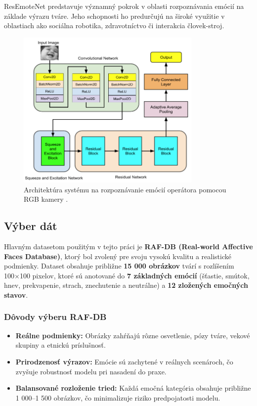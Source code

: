 ResEmoteNet predstavuje významný pokrok v oblasti rozpoznávania emócií na základe výrazu tváre. Jeho schopnosti ho predurčujú na široké využitie v oblastiach ako sociálna robotika, zdravotníctvo či interakcia človek-stroj.

\begin{figure}[!htpb]
    \centering
    \includegraphics[width=0.8\textwidth]{img/architecture.png}
    \caption{Architektúra systému na rozpoznávanie emócií operátora pomocou RGB kamery \cite{misc01}.} 
    \label{fig:architecture}
\end{figure}
\newpage

\subsection{Výber dát}
Hlavným datasetom použitým v tejto práci je \textbf{RAF-DB (Real-world Affective Faces Database)}, ktorý bol zvolený pre svoju vysokú kvalitu a realistické podmienky. Dataset obsahuje približne \textbf{15 000 obrázkov} tvárí s rozlíšením 100×100 pixelov, ktoré sú anotované do \textbf{7 základných emócií} (šťastie, smútok, hnev, prekvapenie, strach, znechutenie a neutrálne) a \textbf{12 zložených emočných stavov}. 

\subsubsection{Dôvody výberu RAF-DB}
\begin{itemize}
    \item \textbf{Reálne podmienky:} Obrázky zahŕňajú rôzne osvetlenie, pózy tváre, vekové skupiny a etnickú príslušnosť.
    \item \textbf{Prirodzenosť výrazov:} Emócie sú zachytené v reálnych scenároch, čo zvyšuje robustnosť modelu pri nasadení do praxe.
    \item \textbf{Balansované rozloženie tried:} Každá emočná kategória obsahuje približne 1 000–1 500 obrázkov, čo minimalizuje riziko predpojatosti modelu.
\end{itemize}

